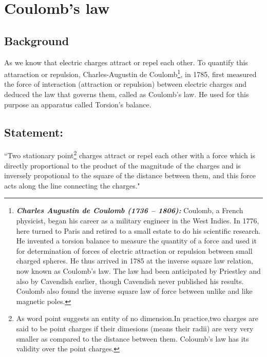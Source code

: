 \section{Coulomb’s law}


\subsection*{Background}
As we know that electric charges attract or repel each other. To quantify
this attaraction or repulsion, Charles-Augustin de Coulomb\footnote{\textbf{\textit{Charles Augustin de Coulomb (1736 – 1806):}} Coulomb,
a French physicist, began his career as a military engineer in the West Indies.
In 1776, here turned to Paris and retired to a small estate to do his
scientific research. He invented a torsion balance to measure the
quantity of a force and used it for determination of forces of electric
attraction or repulsion between small charged spheres. He thus arrived in
1785 at the inverse square law relation, now known as Coulomb’s law. The
law had been anticipated by Priestley and also by Cavendish earlier, though Cavendish
never published his results. Coulomb also found the
inverse square law of force between unlike and like magnetic poles.},
in 1785, first measured the force of interaction (attraction or repulsion) between 
electric charges and deduced the law that governs them, called as Coulomb’s law. He used 
for this purpose an apparatus called Torsion’s balance.


\subsection*{Statement:}
``Two stationary point\footnote{As word point suggests an entity 
of no dimension.In practice,two charges are said to be point 
charges if their dimesions (means their radii) are very very smaller as compared to 
the distance between them. Coloumb’s law
has its validity over the point charges.} charges attract or repel each 
other with a force which is directly proportional to the 
product of the magnitude of the charges and is inversely 
propotional to the square of the distance between them, and 
this force acts along the line connecting the charges."

